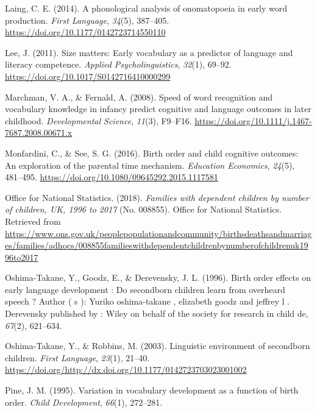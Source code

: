 \documentclass[
  english,
  man,floatsintext]{apa6}
\begin{document}
\leavevmode\hypertarget{ref-laing_phonological_2014}{}%
Laing, C. E. (2014). A phonological analysis of onomatopoeia in early word production. \emph{First Language}, \emph{34}(5), 387--405. \url{https://doi.org/10.1177/0142723714550110}

\leavevmode\hypertarget{ref-lee_size_2011}{}%
Lee, J. (2011). Size matters: Early vocabulary as a predictor of language and literacy competence. \emph{Applied Psycholinguistics}, \emph{32}(1), 69--92. \url{https://doi.org/10.1017/S0142716410000299}

\leavevmode\hypertarget{ref-marchman_speed_2008}{}%
Marchman, V. A., \& Fernald, A. (2008). Speed of word recognition and vocabulary knowledge in infancy predict cognitive and language outcomes in later childhood. \emph{Developmental Science}, \emph{11}(3), F9--F16. \url{https://doi.org/10.1111/j.1467-7687.2008.00671.x}

\leavevmode\hypertarget{ref-monfardini_birth_2016}{}%
Monfardini, C., \& See, S. G. (2016). Birth order and child cognitive outcomes: An exploration of the parental time mechanism. \emph{Education Economics}, \emph{24}(5), 481--495. \url{https://doi.org/10.1080/09645292.2015.1117581}

\leavevmode\hypertarget{ref-office_for_national_statistics_families_2018}{}%
Office for National Statistics. (2018). \emph{Families with dependent children by number of children, UK, 1996 to 2017} (No. 008855). Office for National Statistics. Retrieved from \url{https://www.ons.gov.uk/peoplepopulationandcommunity/birthsdeathsandmarriages/families/adhocs/008855familieswithdependentchildrenbynumberofchildrenuk1996to2017}

\leavevmode\hypertarget{ref-oshima-takane_birth_1996}{}%
Oshima-Takane, Y., Goodz, E., \& Derevensky, J. L. (1996). Birth order effects on early language development : Do secondborn children learn from overheard speech ? Author ( s ): Yuriko oshima-takane , elizabeth goodz and jeffrey l . Derevensky published by : Wiley on behalf of the society for research in child de, \emph{67}(2), 621--634.

\leavevmode\hypertarget{ref-oshima-takane_linguistic_2003}{}%
Oshima-Takane, Y., \& Robbins, M. (2003). Linguistic environment of secondborn children. \emph{First Language}, \emph{23}(1), 21--40. \url{https://doi.org/http://dx.doi.org/10.1177/0142723703023001002}

\leavevmode\hypertarget{ref-pine_variation_1995}{}%
Pine, J. M. (1995). Variation in vocabulary development as a function of birth order. \emph{Child Development}, \emph{66}(1), 272--281.
\end{document}

